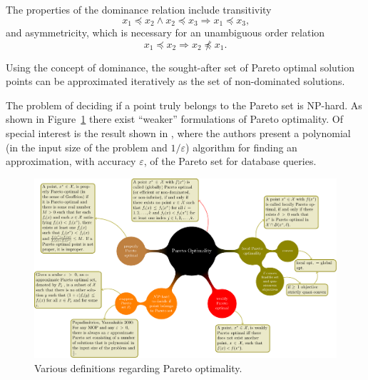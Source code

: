 
The properties of the dominance relation include transitivity
%
\begin{equation*}
  x_1 \preceq x_2 \wedge x_2 \preceq x_3 \Rightarrow x_1 \preceq x_3 \text{,}
\end{equation*}
%
  and asymmetricity, which is necessary for an unambiguous order relation
%
\begin{equation*}
  x_1 \preceq x_2 \Rightarrow x_2 \not\preceq x_1 \text{.}
\end{equation*}
%

Using the concept of dominance, the sought-after set of Pareto optimal
  solution points can be approximated iteratively as the set of non-dominated
  solutions.

The problem of deciding if a point truly belongs to the Pareto set is NP-hard.
As shown in Figure~\ref{fig:pareto-def} there exist ``weaker'' formulations of
  Pareto optimality.
Of special interest is the result shown in \cite{paya:01}, where the authors
  present a polynomial (in the input size of the problem and $1/\varepsilon$)
  algorithm for finding an approximation, with accuracy $\varepsilon$, of the
  Pareto set for database queries.

  \begin{figure}[tp]
  \begin{center}
    \includegraphics[angle=270,width=0.85\linewidth]{figures/opt/pareto-defs.pdf}
  \end{center}
  \caption{Various definitions regarding Pareto optimality.}
  \label{fig:pareto-def}
\end{figure}





